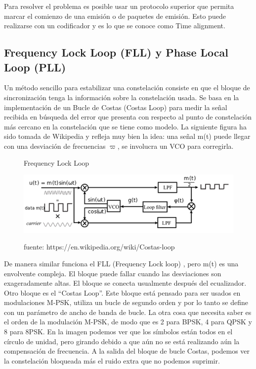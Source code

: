 Para resolver el problema es posible usar un protocolo superior que permita marcar el comienzo de una emisión o de paquetes de emisión. Esto puede realizarse con un codificador y es lo que se conoce como Time alignment. \\


\subsection{Frequency Lock Loop (FLL) y Phase Local Loop (PLL)}

Un método sencillo para estabilizar una constelación consiste en que el bloque de sincronización tenga la información sobre la constelación usada. Se basa en la implementación de un Bucle de Costas (Costas Loop) para medir la señal recibida en búsqueda del error que presenta con respecto al punto de constelación más cercano en la constelación que se tiene como modelo.  La siguiente figura ha sido tomada de Wikipedia  y refleja muy bien la idea: una señal m(t) puede llegar con una desviación de frecuencias $\varpi$, se involucra un VCO para corregirla.  \\


\begin{figure}[h!]
	\captionsetup{justification = raggedright, singlelinecheck = false}
	\caption{Frequency Lock Loop} 
	\centering
	\includegraphics[scale=0.9]{Imagenes/Costas.png}
	\label{fig:Costas}
	\caption*{fuente:  https://en.wikipedia.org/wiki/Costas-loop}
\end{figure}

De manera similar funciona el FLL (Frequency Lock loop) , pero m(t) es una envolvente compleja. El bloque puede fallar cuando las desviaciones son exageradamente altas. El bloque se conecta usualmente después del ecualizador. \\

Otro bloque es el “Costas Loop”. Este bloque está pensado para ser usados en modulaciones M-PSK, utiliza un bucle de segundo orden y por lo tanto se define con un parámetro de ancho de banda de bucle. La otra cosa que necesita saber es el orden de la modulación M-PSK, de modo que es 2 para BPSK, 4 para QPSK y 8 para 8PSK. En la imagen podemos ver que los símbolos están todos en el círculo de unidad, pero girando debido a que aún no se está realizando aún la compensación de frecuencia. A la salida del bloque de bucle Costas, podemos ver la constelación bloqueada más el ruido extra que no podemos suprimir. \\

